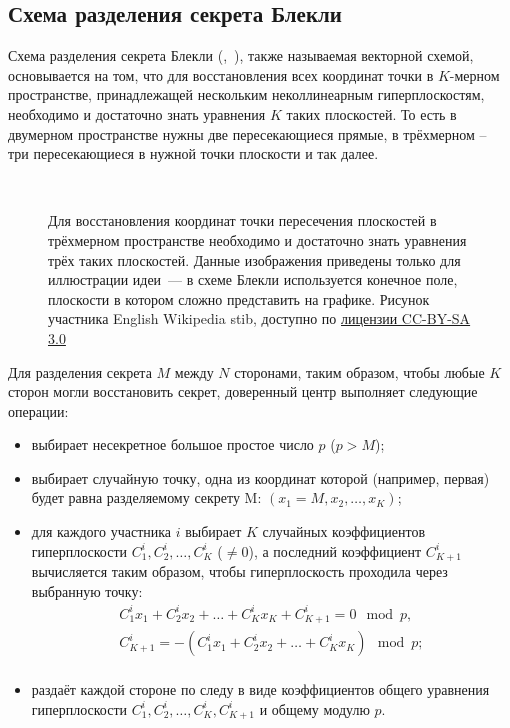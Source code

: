 \subsection[Схема Блэкли]{Схема разделения секрета Блекли}

Схема разделения секрета Блекли (,~\cite{Blackley:1979}), также называемая векторной схемой, основывается на том, что для восстановления всех координат точки в $K$-мерном пространстве, принадлежащей нескольким неколлинеарным гиперплоскостям, необходимо и достаточно знать уравнения $K$ таких плоскостей. То есть в двумерном пространстве нужны две пересекающиеся прямые, в трёхмерном -- три пересекающиеся в нужной точки плоскости и так далее.

\begin{figure}[thb]
	\centering
	~~~~
	\caption{Для восстановления координат точки пересечения плоскостей в трёхмерном пространстве необходимо и достаточно знать уравнения трёх таких плоскостей. Данные изображения приведены только для иллюстрации идеи~--- в схеме Блекли используется конечное поле, плоскости в котором сложно представить на графике. Рисунок участника English Wikipedia stib, доступно по \href{https://creativecommons.org/licenses/by-sa/3.0/deed.ru}{лицензии CC-BY-SA 3.0}}
\end{figure}

Для разделения секрета $M$ между $N$ сторонами, таким образом, чтобы любые $K$ сторон могли восстановить секрет, доверенный центр выполняет следующие операции:
\begin{itemize}
	\item выбирает несекретное большое простое число $p$ ($p > M$);
	\item выбирает случайную точку, одна из координат которой (например, первая) будет равна разделяемому секрету M: $(x_1 = M, x_2, \dots, x_K)$;
	\item для каждого участника $i$ выбирает $K$ случайных коэффициентов гиперплоскости $C^i_1, C^i_2, \dots, C^i_{K}$ ($\ne 0$), а последний коэффициент $C^i_{K+1}$ вычисляется таким образом, чтобы гиперплоскость проходила через выбранную точку:
		\[ \begin{array}{l}
			C^i_1 x_1 + C^i_2 x_2 + \dots + C^i_K x_K + C^i_{K+1} = 0 \mod p, \\
			C^i_{K+1} = - ( C^i_1 x_1 + C^i_2 x_2 + \dots + C^i_K x_K ) \mod p; \\
		\end{array} \]
	\item раздаёт каждой стороне по следу в виде коэффициентов общего уравнения гиперплоскости $C^i_1, C^i_2, \dots, C^i_{K}, C^i_{K+1}$ и общему модулю $p$.
\end{itemize}

